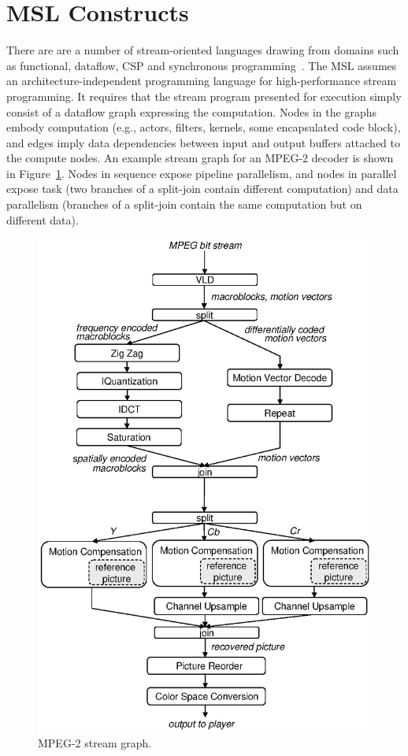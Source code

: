 \section{MSL Constructs}

There are are a number of stream-oriented languages drawing from
domains such as functional, dataflow, CSP and synchronous
programming~\cite{survey97}. The MSL assumes an
architecture-independent programming language for high-performance
stream programming. It requires that the stream program presented for
execution simply consist of a dataflow graph expressing the
computation. Nodes in the graphs embody computation (e.g., actors,
filters, kernels, some encapsulated code block), and edges imply data
dependencies between input and output buffers attached to the compute
nodes. An example stream graph for an MPEG-2 decoder is shown in
Figure~\ref{fig:mpeg}. Nodes in sequence expose pipeline parallelism,
and nodes in parallel expose task (two branches of a split-join
contain different computation) and data parallelism (branches of a
split-join contain the same computation but on different data).

\begin{figure}[tb]
\begin{center}
\includegraphics[scale=.55]{figs/mpeg2d}
\end{center}
\caption[MPEG-2 stream graph.]{MPEG-2 stream graph.}
\label{fig:mpeg}
\end{figure}

